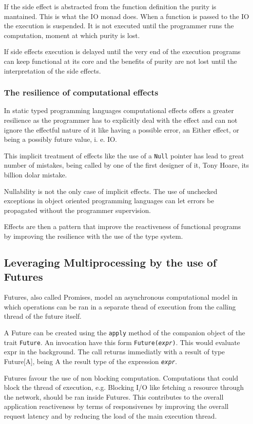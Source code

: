 \documentclass[../main.tex]{subfiles}
\begin{document}
If the side effect is abstracted from the function definition the purity is
mantained. This is what the IO monad does. When a function is passed to the IO
the execution is suspended. It is not executed until the programmer runs the
computation, moment at which purity is lost.

If side effects execution is delayed until the very end of the execution programs
can keep functional at its core and the benefits of purity are not lost until
the interpretation of the side effects.

\subsubsection{The resilience of computational effects}
In static typed programming languages computational effects offers a greater resilience as the
programmer has to explicitly deal with the effect and can not ignore the
effectful nature of it like having a possible error, an Either effect, or being a possibly
future value, i. e. IO.

This implicit treatment of effects like the use of a \texttt{Null} pointer has
lead to great number of mistakes, being called by one of the first designer of
it, Tony Hoare, its billion dolar mistake.

Nullability is not the only case of implicit effects. The use of unchecked
exceptions in object oriented programming languages can let errors be propagated
without the programmer supervision.

Effects are then a pattern that improve the reactiveness of functional programs by
improving the resilience with the use of the type system.

\subsection{Leveraging Multiprocessing by the use of Futures}
Futures, also called Promises, model an asynchronous computational model in
which operations can be ran in a separate thead of execution from the calling
thread of the future itself.

A Future can be created using the \texttt{apply} method of the companion object
of the trait \texttt{Future}. An invocation have this form
\texttt{Future(\textit{expr})}. This would evaluate expr in the background. The
call returns immediatly with a result of type Future[A], being A the result type
of the expression \texttt{\textit{expr}}.

Futures favour the use of non blocking computation. Computations that could
block the thread of execution, e.g. Blocking I/O like fetching a resource
through the network, should be ran inside Futures. This contributes to
the overall application reactiveness by terms of responsivenes by improving the
overall request latency and by reducing the load of the main execution thread.
\end{document}
